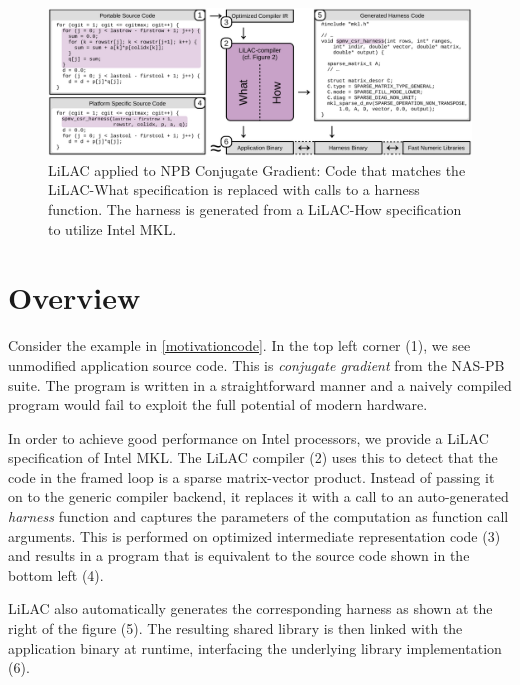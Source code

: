 \begin{figure}[t]
\includegraphics[width=\textwidth]{figures/lilac_overview.pdf}
\caption{LiLAC applied to NPB Conjugate Gradient:
         Code that matches the LiLAC-What specification is replaced with calls
         to a harness function. The harness is generated from a LiLAC-How
         specification to utilize Intel MKL.}
\label{motivationcode}
\end{figure}

\section{Overview}
\label{sec:overview}

Consider the example in \autoref{motivationcode}.  In the top left
corner (1), we see unmodified application source code.  This is
{\em conjugate gradient} from the NAS-PB suite.  The program is written
in a straightforward manner and a naively compiled program would fail
to exploit the full potential of modern hardware.

In order to achieve good performance on Intel processors, we provide a
LiLAC specification of Intel MKL.
The LiLAC compiler (2) uses this to detect that the code in the framed loop is a
sparse matrix-vector product.
Instead of passing it on to the generic compiler backend, it replaces it with a
call to an auto-generated {\em harness} function  and captures the parameters of the computation
as function call arguments.
This is performed on optimized intermediate representation code (3)
and results in a program that is equivalent to the source code shown in the
bottom left (4).

LiLAC also automatically generates the corresponding harness as shown at
the right of the figure (5).
The resulting shared library is then linked with the application binary at
runtime, interfacing the underlying library implementation (6).

